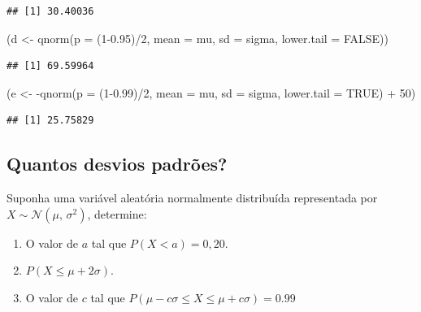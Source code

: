 \documentclass[
]{book}
\newenvironment{Shaded}{\begin{snugshade}}{\end{snugshade}}
\newcommand{\AttributeTok}[1]{\textcolor[rgb]{0.77,0.63,0.00}{#1}}
\newcommand{\ConstantTok}[1]{\textcolor[rgb]{0.00,0.00,0.00}{#1}}
\newcommand{\DecValTok}[1]{\textcolor[rgb]{0.00,0.00,0.81}{#1}}
\newcommand{\FloatTok}[1]{\textcolor[rgb]{0.00,0.00,0.81}{#1}}
\newcommand{\FunctionTok}[1]{\textcolor[rgb]{0.00,0.00,0.00}{#1}}
\newcommand{\NormalTok}[1]{#1}
\newcommand{\OtherTok}[1]{\textcolor[rgb]{0.56,0.35,0.01}{#1}}
\newcommand{\SpecialCharTok}[1]{\textcolor[rgb]{0.00,0.00,0.00}{#1}}
\providecommand{\tightlist}{%
  \setlength{\itemsep}{0pt}\setlength{\parskip}{0pt}}
\begin{document}
\begin{verbatim}
## [1] 30.40036
\end{verbatim}

\begin{Shaded}
\begin{Highlighting}[]
\NormalTok{(d }\OtherTok{\textless{}{-}} \FunctionTok{qnorm}\NormalTok{(}\AttributeTok{p =}\NormalTok{ (}\DecValTok{1}\FloatTok{{-}0.95}\NormalTok{)}\SpecialCharTok{/}\DecValTok{2}\NormalTok{, }\AttributeTok{mean =}\NormalTok{ mu, }\AttributeTok{sd =}\NormalTok{ sigma, }\AttributeTok{lower.tail =} \ConstantTok{FALSE}\NormalTok{))}
\end{Highlighting}
\end{Shaded}

\begin{verbatim}
## [1] 69.59964
\end{verbatim}

\begin{Shaded}
\begin{Highlighting}[]
\NormalTok{(e }\OtherTok{\textless{}{-}} \SpecialCharTok{{-}}\FunctionTok{qnorm}\NormalTok{(}\AttributeTok{p =}\NormalTok{ (}\DecValTok{1}\FloatTok{{-}0.99}\NormalTok{)}\SpecialCharTok{/}\DecValTok{2}\NormalTok{, }\AttributeTok{mean =}\NormalTok{ mu, }\AttributeTok{sd =}\NormalTok{ sigma, }\AttributeTok{lower.tail =} \ConstantTok{TRUE}\NormalTok{) }\SpecialCharTok{+} \DecValTok{50}\NormalTok{)}
\end{Highlighting}
\end{Shaded}

\begin{verbatim}
## [1] 25.75829
\end{verbatim}

\hypertarget{quantos-desvios-padruxf5es}{%
\subsection{Quantos desvios padrões?}\label{quantos-desvios-padruxf5es}}

Suponha uma variável aleatória normalmente distribuída representada por \(X \sim \mathcal{N}(\mu,\,\sigma^2)\), determine:

\begin{enumerate}
\def\labelenumi{\roman{enumi}.}
\tightlist
\item
  O valor de \(a\) tal que \(P(X < a) = 0,20\).
\item
  \(P(X \le \mu + 2\sigma)\).
\item
  O valor de \(c\) tal que \(P(\mu -c\sigma \le X \le \mu +c\sigma) = 0.99\)
\end{enumerate}
\end{document}
